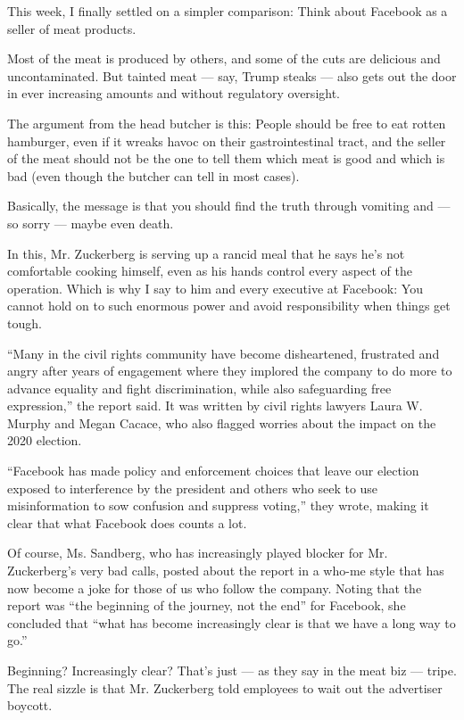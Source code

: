 This week, I finally settled on a simpler comparison: Think about
Facebook as a seller of meat products.

Most of the meat is produced by others, and some of the cuts are
delicious and uncontaminated. But tainted meat --- say, Trump steaks ---
also gets out the door in ever increasing amounts and without regulatory
oversight.

The argument from the head butcher is this: People should be free to eat
rotten hamburger, even if it wreaks havoc on their gastrointestinal
tract, and the seller of the meat should not be the one to tell them
which meat is good and which is bad (even though the butcher can tell in
most cases).

Basically, the message is that you should find the truth through
vomiting and --- so sorry --- maybe even death.

In this, Mr. Zuckerberg is serving up a rancid meal that he says he's
not comfortable cooking himself, even as his hands control every aspect
of the operation. Which is why I say to him and every executive at
Facebook: You cannot hold on to such enormous power and avoid
responsibility when things get tough.

``Many in the civil rights community have become disheartened,
frustrated and angry after years of engagement where they implored the
company to do more to advance equality and fight discrimination, while
also safeguarding free expression,'' the report said. It was written by
civil rights lawyers Laura W. Murphy and Megan Cacace, who also flagged
worries about the impact on the 2020 election.

``Facebook has made policy and enforcement choices that leave our
election exposed to interference by the president and others who seek to
use misinformation to sow confusion and suppress voting,'' they wrote,
making it clear that what Facebook does counts a lot.

Of course, Ms. Sandberg, who has increasingly played blocker for Mr.
Zuckerberg's very bad calls, posted about the report in a who-me style
that has now become a joke for those of us who follow the company.
Noting that the report was ``the beginning of the journey, not the end''
for Facebook, she concluded that ``what has become increasingly clear is
that we have a long way to go.''

Beginning? Increasingly clear? That's just --- as they say in the meat
biz --- tripe. The real sizzle is that Mr. Zuckerberg told employees to
wait out the advertiser boycott.

